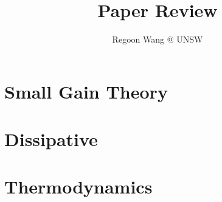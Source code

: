 \documentclass[10pt,a4paper]{article}
\begin{document}
\title{Paper Review}
\author{Regoon Wang @ UNSW}
\maketitle

\tableofcontents
\section{Small Gain Theory}
\section{Dissipative}
\section{Thermodynamics}
\end{document}
